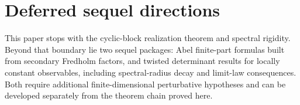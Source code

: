 \section{Deferred sequel directions}
\label{sec:perturbation}

This paper stops with the cyclic-block realization theorem and spectral
rigidity. Beyond that boundary lie two sequel packages: Abel finite-part
formulas built from secondary Fredholm factors, and twisted determinant
results for locally constant observables, including spectral-radius
decay and limit-law consequences. Both require additional
finite-dimensional perturbative hypotheses and can be developed
separately from the theorem chain proved here.
